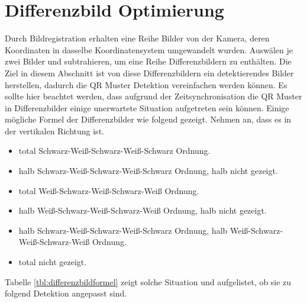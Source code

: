 \section{Differenzbild Optimierung}
Durch Bildregistration erhalten eine Reihe Bilder von der Kamera, deren Koordinaten in dasselbe Koordinatensystem umgewandelt wurden. Auswälen je zwei Bilder und subtrahieren, um eine Reihe Differenzbildern zu enthälten. Die Ziel in diesem Abschnitt ist von diese Differenzbildern ein detektierendes Bilder herstellen, dadurch die QR Muster Detektion vereinfachen werden können. Es sollte hier beachtet werden, dass aufgrund der Zeitsynchronisation die QR Muster in Differenzbilder einige unerwartete Situation aufgetreten sein können. Einige mögliche Formel der Differenzbilder wie folgend gezeigt. Nehmen an, dass es in der vertikalen Richtung ist.

\begin{itemize}
	\item total Schwarz-Weiß-Schwarz-Weiß-Schwarz Ordnung.
	\item halb Schwarz-Weiß-Schwarz-Weiß-Schwarz Ordnung, halb nicht gezeigt.
	\item total Weiß-Schwarz-Weiß-Schwarz-Weiß Ordnung.
	\item halb Weiß-Schwarz-Weiß-Schwarz-Weiß Ordnung, halb nicht gezeigt.
	\item halb Schwarz-Weiß-Schwarz-Weiß-Schwarz Ordnung, halb Weiß-Schwarz-Weiß-Schwarz-Weiß Ordnung.
	\item total nicht gezeigt.
\end{itemize}

Tabelle \ref{tbl:differenzbildformel} zeigt solche Situation und aufgelistet, ob sie zu folgend Detektion angepasst sind.

